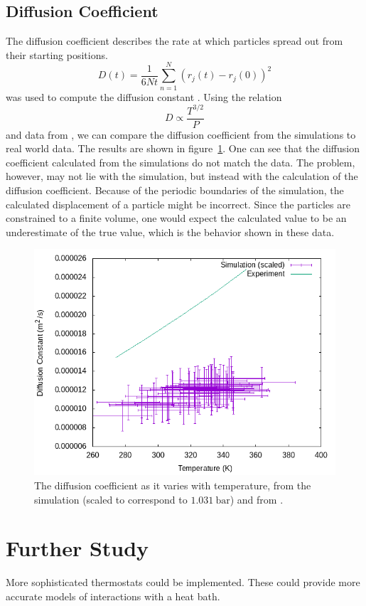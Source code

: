 \documentclass[]{article}
\newcommand{\unit}[2]{#1~\mathrm{#2}}
\begin{document}
\subsection{Diffusion Coefficient}
The diffusion coefficient describes the rate at which particles spread out from their starting positions.
\[
	D(t) = \frac{1}{6 N t} \sum_{n=1}^{N}\left( r_{j}(t) - r_{j}(0)\right)^{2}
\]
was used to compute the diffusion constant \cite{weizhong2008}.
Using the relation
\[
	D \propto \frac{T^{3/2}}{P}
\]
and data from \cite{kestin1984}, we can compare the diffusion coefficient from the simulations to real world data.
The results are shown in figure~\ref{fig:D_T}.
One can see that the diffusion coefficient calculated from the simulations do not match the data.
The problem, however, may not lie with the simulation, but instead with the calculation of the diffusion coefficient.
Because of the periodic boundaries of the simulation, the calculated displacement of a particle might be incorrect.
Since the particles are constrained to a finite volume, one would expect the calculated value to be an underestimate of the true value, which is the behavior shown in these data.

\begin{figure}[htb]
	\centering
	\includegraphics[width=\textwidth]{figures/D_T.png}
	\caption{The diffusion coefficient as it varies with temperature, from the simulation (scaled to correspond to $\unit{1.031}{bar}$) and from \cite{kestin1984}.}
	\label{fig:D_T}
\end{figure}

\section{Further Study}
More sophisticated thermostats could be implemented.
These could provide more accurate models of interactions with a heat bath.
\end{document}
